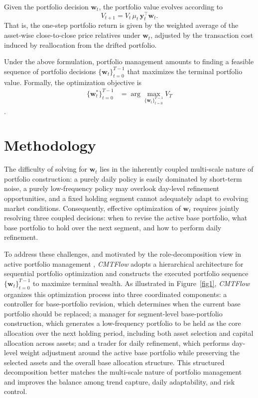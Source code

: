 \documentclass[letterpaper]{article} %
\begin{document}
Given the portfolio decision $\mathbf{w}_t$, the portfolio value evolves according to
\[
V_{t+1} = V_t\,\mu_t\, \mathbf{y}_t^\top \mathbf{w}_t.
\]
That is, the one-step portfolio return is given by the weighted average of the asset-wise close-to-close price relatives under $\mathbf{w}_t$, adjusted by the transaction cost induced by reallocation from the drifted portfolio.

Under the above formulation, portfolio management amounts to finding a feasible sequence of portfolio decisions $\{\mathbf{w}_t\}_{t=0}^{T-1}$ that maximizes the terminal portfolio value. Formally, the optimization objective is
\[
\begin{aligned}
\{\mathbf{w}_t^*\}_{t=0}^{T-1}
&= \arg\max_{\{\mathbf{w}_t\}_{t=0}^{T-1}} V_T
\end{aligned}
\].

\section{Methodology}
The difficulty of solving for \(\mathbf{w}_t\) lies in the inherently coupled multi-scale nature of portfolio construction: a purely daily policy is easily dominated by short-term noise, a purely low-frequency policy may overlook day-level refinement opportunities, and a fixed holding segment cannot adequately adapt to evolving market conditions. Consequently, effective optimization of \(\mathbf{w}_t\) requires jointly resolving three coupled decisions: when to revise the active base portfolio, what base portfolio to hold over the next segment, and how to perform daily refinement.

To address these challenges, and motivated by the role-decomposition view in active portfolio management \citep{kahn1999active}, \textit{CMTFlow} adopts a hierarchical architecture for sequential portfolio optimization and constructs the executed portfolio sequence \(\{\mathbf{w}_t\}_{t=0}^{T-1}\) to maximize terminal wealth. As illustrated in Figure~\ref{fig1}, \textit{CMTFlow} organizes this optimization process into three coordinated components: a controller for base-portfolio revision, which determines when the current base portfolio should be replaced; a manager for segment-level base-portfolio construction, which generates a low-frequency portfolio to be held as the core allocation over the next holding period, including both asset selection and capital allocation across assets; and a trader for daily refinement, which performs day-level weight adjustment around the active base portfolio while preserving the selected assets and the overall base allocation structure. This structured decomposition better matches the multi-scale nature of portfolio management and improves the balance among trend capture, daily adaptability, and risk control.
\end{document}
